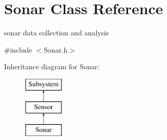 \hypertarget{classSonar}{\section{Sonar Class Reference}
\label{classSonar}
}


sonar data collection and analysis  




{\ttfamily \#include $<$Sonar.\-h$>$}

Inheritance diagram for Sonar\-:\begin{figure}[H]
\begin{center}
\leavevmode
\includegraphics[height=3.000000cm]{classSonar}
\end{center}
\end{figure}
